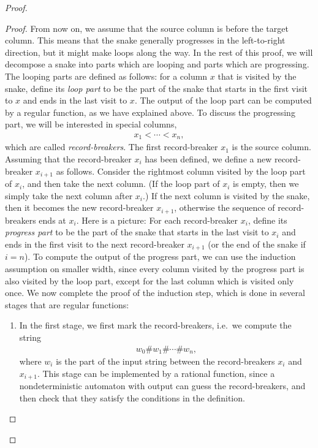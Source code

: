 \begin{proof}
\begin{proof}
    From now on, we assume that the source column is before the target column. This means that the snake generally progresses in the left-to-right direction, but it might make loops along the way. 
    In the rest of this proof, we will decompose a snake into parts which are looping and parts which are progressing. The looping parts are defined as follows: for  a column $x$ that is visited by the snake, define its \emph{loop part} to be the part of the snake that starts in the first visit to $x$ and ends in the last visit to $x$.  The output of the loop part can be computed by a regular function, as we have explained above. To discuss the progressing part, we will be interested in special columns,
    \begin{align*}
    x_1 < \cdots < x_n,
    \end{align*}
    which are called \emph{record-breakers}. The first record-breaker $x_1$ is the source column. Assuming that the record-breaker $x_i$ has been defined, we define a new record-breaker  $x_{i+1}$ as follows. Consider  the rightmost column visited by the loop part of $x_i$, and then take the next column. (If the loop part of $x_i$ is empty, then we simply take the next column after $x_i$.) If the next column is visited by the snake, then it becomes the new record-breaker $x_{i+1}$, otherwise the sequence of record-breakers ends at $x_i$.  Here is a picture: 
    For each record-breaker $x_i$, define its \emph{progress part} to be the part of the snake that starts in the last visit to $x_i$ and ends in the first visit to the next record-breaker $x_{i+1}$ (or the end of the snake if $i = n$). To compute the output of the progress part, we can use the induction assumption on smaller width, since every column visited by the progress part is also visited by the loop part, except for the last column which is visited only once. We now complete the proof of the induction step, which is done in several stages that are regular functions:
        \begin{enumerate}
            \item In the first stage, we first  mark the record-breakers, i.e.~we compute the string
        \begin{align*}
        w_0 \# w_1 \# \cdots \# w_n,
        \end{align*}
        where $w_i$ is the part of the input string between the record-breakers $x_i$ and $x_{i+1}$. This stage can be implemented by a rational function, since a nondeterministic automaton with output can guess the record-breakers, and then check that they satisfy the conditions in the definition.

\end{enumerate}
\end{proof}
\end{proof}
